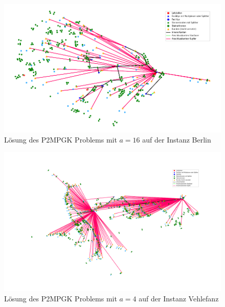 \documentclass[11pt,a4paper]{article}
\theoremstyle{my_th_style1}
\begin{document}
\begin{figure}[!htbp]
	\begin{center}
		\begin{minipage}{15.0cm}
			\includegraphics[width=1\textwidth]{./Bilder/P2MPGK_Berlin_demand1_duration0_SN16}
			\caption{L\"osung des P2MPGK Problems mit \(a = 16\) auf der Instanz Berlin}
			\label{p2mpgk_b_pic_sn16}
		\end{minipage}
	\end{center}
\end{figure}

\begin{figure}[!htbp]
	\begin{center}
		\begin{minipage}{15.0cm}
			\includegraphics[width=1\textwidth]{./Bilder/P2MPGK_Vehlefanz_demand1_duration0}
			\caption{L\"osung des P2MPGK Problems mit \(a = 4\) auf der Instanz Vehlefanz}
			\label{p2mpgk_v_pic_sn4}
		\end{minipage}
	\end{center}
\end{figure}
\end{document}

